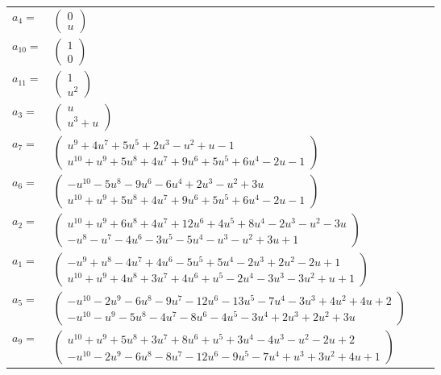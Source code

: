 \documentclass[1p]{elsarticle_modified}
\theoremstyle{definition}
\begin{document}
\begin{tabular}{m{7pt} m{180pt} m{7pt} m{180pt} }
\flushright $a_{4}=$&$\begin{pmatrix}0\\u\end{pmatrix}$ \\
\flushright $a_{10}=$&$\begin{pmatrix}1\\0\end{pmatrix}$ \\
\flushright $a_{11}=$&$\begin{pmatrix}1\\u^2\end{pmatrix}$ \\
\flushright $a_{3}=$&$\begin{pmatrix}u\\u^3+u\end{pmatrix}$ \\
\flushright $a_{7}=$&$\begin{pmatrix}u^9+4 u^7+5 u^5+2 u^3- u^2+u-1\\u^{10}+u^9+5 u^8+4 u^7+9 u^6+5 u^5+6 u^4-2 u-1\end{pmatrix}$ \\
\flushright $a_{6}=$&$\begin{pmatrix}- u^{10}-5 u^8-9 u^6-6 u^4+2 u^3- u^2+3 u\\u^{10}+u^9+5 u^8+4 u^7+9 u^6+5 u^5+6 u^4-2 u-1\end{pmatrix}$ \\
\flushright $a_{2}=$&$\begin{pmatrix}u^{10}+u^9+6 u^8+4 u^7+12 u^6+4 u^5+8 u^4-2 u^3- u^2-3 u\\- u^8- u^7-4 u^6-3 u^5-5 u^4- u^3- u^2+3 u+1\end{pmatrix}$ \\
\flushright $a_{1}=$&$\begin{pmatrix}- u^9+u^8-4 u^7+4 u^6-5 u^5+5 u^4-2 u^3+2 u^2-2 u+1\\u^{10}+u^9+4 u^8+3 u^7+4 u^6+u^5-2 u^4-3 u^3-3 u^2+u+1\end{pmatrix}$ \\
\flushright $a_{5}=$&$\begin{pmatrix}- u^{10}-2 u^9-6 u^8-9 u^7-12 u^6-13 u^5-7 u^4-3 u^3+4 u^2+4 u+2\\- u^{10}- u^9-5 u^8-4 u^7-8 u^6-4 u^5-3 u^4+2 u^3+2 u^2+3 u\end{pmatrix}$ \\
\flushright $a_{9}=$&$\begin{pmatrix}u^{10}+u^9+5 u^8+3 u^7+8 u^6+u^5+3 u^4-4 u^3- u^2-2 u+2\\- u^{10}-2 u^9-6 u^8-8 u^7-12 u^6-9 u^5-7 u^4+u^3+3 u^2+4 u+1\end{pmatrix}$ \\

\end{tabular}
\end{document}
